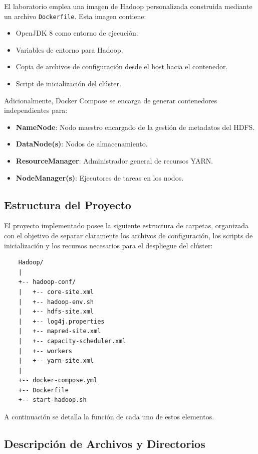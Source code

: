El laboratorio emplea una imagen de Hadoop personalizada construida mediante un archivo \texttt{Dockerfile}. Esta imagen contiene:

\begin{itemize}
    \item OpenJDK 8 como entorno de ejecución.
    \item Variables de entorno para Hadoop.
    \item Copia de archivos de configuración desde el host hacia el contenedor.
    \item Script de inicialización del clúster.
\end{itemize}

Adicionalmente, Docker Compose se encarga de generar contenedores independientes para:

\begin{itemize}
    \item \textbf{NameNode}: Nodo maestro encargado de la gestión de metadatos del HDFS.
    \item \textbf{DataNode(s)}: Nodos de almacenamiento.
    \item \textbf{ResourceManager}: Administrador general de recursos YARN.
    \item \textbf{NodeManager(s)}: Ejecutores de tareas en los nodos.
\end{itemize}

\subsection{Estructura del Proyecto}

El proyecto implementado posee la siguiente estructura de carpetas, organizada con el objetivo de separar claramente los archivos de configuración, los scripts de inicialización y los recursos necesarios para el despliegue del clúster:

    \begin{verbatim}
    Hadoop/
    |
    +-- hadoop-conf/
    |   +-- core-site.xml
    |   +-- hadoop-env.sh
    |   +-- hdfs-site.xml
    |   +-- log4j.properties
    |   +-- mapred-site.xml
    |   +-- capacity-scheduler.xml
    |   +-- workers
    |   +-- yarn-site.xml
    |
    +-- docker-compose.yml
    +-- Dockerfile
    +-- start-hadoop.sh
    \end{verbatim}

A continuación se detalla la función de cada uno de estos elementos.

\subsection{Descripción de Archivos y Directorios}

